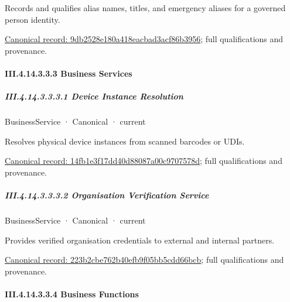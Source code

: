 Records and qualifies alias names, titles, and emergency aliases for a governed person identity.


{\footnotesize \href{../../../../../../../continuum/business/business-function/9db2528e180a418eacbad3acf86b3956.md}{Canonical record: 9db2528e180a418eacbad3acf86b3956}; full qualifications and provenance.}\par
\paragraph*{III.4.14.3.3.3 Business Services}
\label{navigation:III.4.14.3.3.3}

\subparagraph*{III.4.14.3.3.3.1 Device Instance Resolution}
\label{navigation:III.4.14.3.3.3.1}

\label{element:14fb1e3f17dd40d88087a00c9707578d}
{\small BusinessService · Canonical · current}\par

Resolves physical device instances from scanned barcodes or UDIs.


{\footnotesize \href{../../../../../../../continuum/business/business-service/14fb1e3f17dd40d88087a00c9707578d.md}{Canonical record: 14fb1e3f17dd40d88087a00c9707578d}; full qualifications and provenance.}\par
\subparagraph*{III.4.14.3.3.3.2 Organisation Verification Service}
\label{navigation:III.4.14.3.3.3.2}

\label{element:223b2cbe762b40efb9f05bb5cdd66bcb}
{\small BusinessService · Canonical · current}\par

Provides verified organisation credentials to external and internal partners.


{\footnotesize \href{../../../../../../../continuum/business/business-service/223b2cbe762b40efb9f05bb5cdd66bcb.md}{Canonical record: 223b2cbe762b40efb9f05bb5cdd66bcb}; full qualifications and provenance.}\par
\paragraph*{III.4.14.3.3.4 Business Functions}
\label{navigation:III.4.14.3.3.4}

